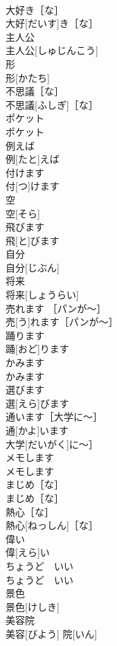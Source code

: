 \documentclass[8pt]{extreport}
\begin{document}
\begin{CJK}{UTF8}{min}
\\	大好き［な］	
\\	大好[だいす]き［な］	
\\	主人公	
\\	主人公[しゅじんこう]	
\\	形	
\\	形[かたち]	
\\	不思議［な］	
\\	不思議[ふしぎ]［な］	
\\	ポケット	
\\	ポケット	
\\	例えば	
\\	例[たと]えば	
\\	付けます	
\\	付[つ]けます	
\\	空	
\\	空[そら]	
\\	飛びます	
\\	飛[と]びます	
\\	自分	
\\	自分[じぶん]	
\\	将来	
\\	将来[しょうらい]	
\\	売れます ［パンが〜］	
\\	売[う]れます［パンが〜］	
\\	踊ります	
\\	踊[おど]ります	
\\	かみます	
\\	かみます	
\\	選びます	
\\	選[えら]びます	
\\	通います［大学に〜］	
\\	通[かよ]います
\\	大学[だいがく]に〜］	
\\	メモします	
\\	メモします	
\\	まじめ［な］	
\\	まじめ［な］	
\\	熱心［な］	
\\	熱心[ねっしん]［な］	
\\	偉い	
\\	偉[えら]い	
\\	ちょうど　いい	
\\	ちょうど　いい	
\\	景色	
\\	景色[けしき]	
\\	美容院	
\\	美容[びよう] 院[いん]	

\end{CJK}
\end{document}
